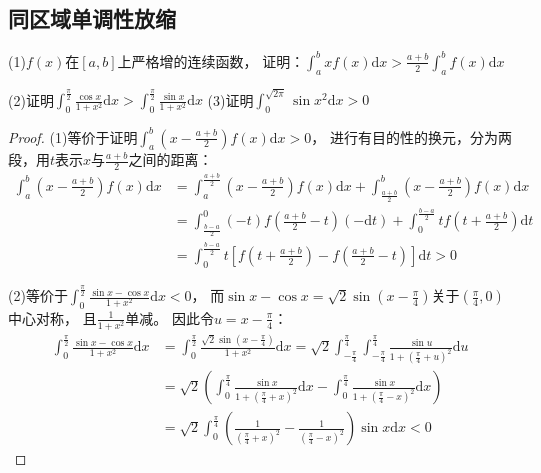 \subsection{同区域单调性放缩}

\begin{exercise}[几道经典同区域相减]
  (1)$f(x)$在$[a,b]$上严格增的连续函数，
  证明：$\int_a^b x f(x)\mathrm{d} x > \frac{a+b}{2} \int_a^b f(x)\mathrm{d} x$

  (2)证明$\int_0^{\frac{\pi}{2}} \frac{\cos x}{1 + x^2}\mathrm{d} x > \int_0^{\frac{\pi}{2}} \frac{\sin x}{1 + x^2}\mathrm{d} x$
  (3)证明$\int_0^{\sqrt{2\pi}} \sin x^2 \mathrm{d} x > 0$
\end{exercise}

\begin{proof}
  (1)等价于证明$\int_a^b \left( x - \frac{a+b}{2} \right)f(x) \mathrm{d} x > 0$，
  进行有目的性的换元，分为两段，用$t$表示$x$与$\frac{a+b}{2}$之间的距离：
  \begin{align*}
    \int_a^b \left( x - \frac{a+b}{2} \right)f(x)\mathrm{d} x &=  \int_a^{\frac{a+b}{2}} \left( x - \frac{a+b}{2} \right) f(x)\mathrm{d} x + \int_{\frac{a+b}{2}}^b \left( x - \frac{a+b}{2} \right) f(x)\mathrm{d} x\\
                                                              &= \int_{\frac{b-a}{2}}^0 (-t) f(\frac{a+b}{2} - t)(-\mathrm{d} t) + \int_0^{\frac{b-a}{2}} tf(t + \frac{a+b}{2})\mathrm{d} t\\
    &= \int _0^{\frac{b-a}{2}} t \left[ f(t + \frac{a+b}{2}) - f(\frac{a+b}{2} - t) \right]\mathrm{d} t > 0
  \end{align*}

  (2)等价于$\int_0^{\frac{\pi}{2}} \frac{\sin x - \cos x}{1 + x^2}\mathrm{d} x < 0$，
  而$\sin x- \cos x = \sqrt{2} \sin (x - \frac{\pi}{4})$关于$\left( \frac{\pi}{4},0 \right)$中心对称，
  且$\frac{1}{1+x^2}$单减。
  因此令$u = x - \frac{\pi}{4}$：
  \begin{align*}
   \int_0^{\frac{\pi}{2}} \frac{\sin x - \cos x }{1 + x^2}\mathrm{d} x & = \int _0^{\frac{\pi}{2}} \frac{\sqrt{2} \sin (x - \frac{\pi}{4})}{1 + x^2}\mathrm{d} x = \sqrt{2} \int_{-\frac{\pi}{4}}^{\frac{\pi}{4}} \int_{-\frac{\pi}{4}}^{\frac{\pi}{4}} \frac{\sin u}{1 + (\frac{\pi}{4} + u)^2}\mathrm{d} u\\
    &= \sqrt{2} \left( \int_0^{\frac{\pi}{4}} \frac{\sin x}{1 + (\frac{\pi}{4} + x)^2} \mathrm{d} x - \int _0^{\frac{\pi}{4}} \frac{\sin x}{1 + (\frac{\pi}{4} - x)^2}\mathrm{d} x \right)\\
                                                                       &= \sqrt{2} \int_0^{\frac{\pi}{4}} \left( \frac{1}{(\frac{\pi}{4} + x)^2} - \frac{1}{(\frac{\pi}{4} - x)^2} \right)\sin x \mathrm{d} x< 0
  \end{align*}
\end{proof}

